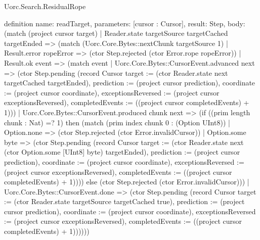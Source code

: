 \begin{lexlean}{Uorc.Search.ResidualRope}
\begin{semanticmodule}
definition{
  name: readTarget,
  parameters: [cursor : Cursor],
  result: Step,
  body: (match (project cursor target)
    | Reader.state targetSource targetCached targetEnded => (match (Uorc.Core.Bytes::nextChunk targetSource 1)
      | Result.error ropeError => (ctor Step.rejected (ctor Error.rope ropeError))
      | Result.ok event => (match event
        | Uorc.Core.Bytes::CursorEvent.advanced next => (ctor Step.pending (record Cursor {target := (ctor Reader.state next targetCached targetEnded), prediction := (project cursor prediction), coordinate := (project cursor coordinate), exceptionsReversed := (project cursor exceptionsReversed), completedEvents := ((project cursor completedEvents) + 1)}))
        | Uorc.Core.Bytes::CursorEvent.produced chunk next => (if ((prim length chunk : Nat) =? 1) then (match (prim index chunk 0 : (Option UInt8))
          | Option.none => (ctor Step.rejected (ctor Error.invalidCursor))
          | Option.some byte => (ctor Step.pending (record Cursor {target := (ctor Reader.state next (ctor Option.some [UInt8] byte) targetEnded), prediction := (project cursor prediction), coordinate := (project cursor coordinate), exceptionsReversed := (project cursor exceptionsReversed), completedEvents := ((project cursor completedEvents) + 1)}))) else (ctor Step.rejected (ctor Error.invalidCursor)))
        | Uorc.Core.Bytes::CursorEvent.done => (ctor Step.pending (record Cursor {target := (ctor Reader.state targetSource targetCached true), prediction := (project cursor prediction), coordinate := (project cursor coordinate), exceptionsReversed := (project cursor exceptionsReversed), completedEvents := ((project cursor completedEvents) + 1)})))))
}


\end{semanticmodule}
\end{lexlean}

